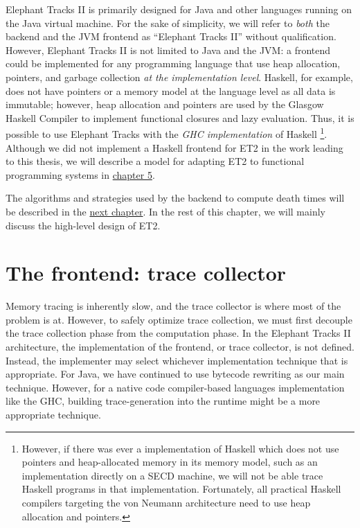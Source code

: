 Elephant Tracks II is primarily designed for Java and other languages running on the Java virtual machine. For the sake of simplicity,
we will refer to \emph{both} the backend and the JVM frontend as ``Elephant Tracks II'' without qualification. However, Elephant Tracks II is not limited
to Java and the JVM: a frontend could be implemented for any programming language that use heap allocation, pointers, and garbage collection
\emph{at the implementation level}. Haskell, for example, does not have pointers or a memory model at the language level as all data is
immutable; however, heap allocation and pointers are used by the Glasgow Haskell Compiler to implement functional closures and lazy evaluation.
Thus, it is possible to use Elephant Tracks with the \emph{GHC implementation} of Haskell \footnote{However, if there was ever a
  implementation of Haskell which does not use pointers and heap-allocated memory in its memory model, such as an implementation
  directly on a SECD machine, we will not be able trace Haskell programs in that implementation. Fortunately, all practical Haskell
  compilers targeting the von Neumann architecture need to use heap allocation and pointers.}. Although we did not implement a Haskell
frontend for ET2 in the work leading to this thesis, we will describe a model for adapting ET2 to functional programming systems in
\hyperref[chap:extensible]{chapter 5}.

The algorithms and strategies used by the backend to compute death times will be described in the \hyperref[chap:algoimp]{next chapter}. In
the rest of this chapter, we will mainly discuss the high-level design of ET2.

\section{The frontend: trace collector}
Memory tracing is inherently slow, and the trace collector is where most of the problem is at. However, to safely optimize trace collection, we must
first decouple the trace collection phase from the computation phase. In the Elephant Tracks II architecture, the implementation of the
frontend, or trace collector, is not defined. Instead, the implementer may select whichever implementation technique that is appropriate. For Java,
we have continued to use bytecode rewriting as our main technique. However, for a native code compiler-based languages implementation like the GHC,
building trace-generation into the runtime might be a more appropriate technique.

